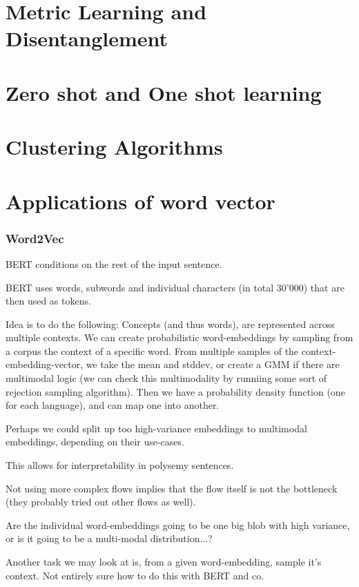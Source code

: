 \documentclass[a4paper,12pt,twoside,openright]{report}
\begin{document}
\section{Metric Learning and Disentanglement}

\section{Zero shot and One shot learning }

\section{Clustering Algorithms}

\section{Applications of word vector}

\newpage
\subsubsection{Word2Vec}

BERT conditions on the rest of the input sentence.

BERT uses words, subwords and individual characters (in total 30'000) that are then used as tokens.

Idea is to do the following:
Concepts (and thus words), are represented across multiple contexts.
We can create probabilistic word-embeddings by sampling from a corpus the context of a specific word.
From multiple samples of the context-embedding-vector, we take the mean and stddev, or create a GMM if there are multimodal logic (we can check this multimodality by runniing some sort of rejection sampling algorithm).
Then we have a probability density function (one for each language), and can map one into another.

Perhaps we could split up too high-variance embeddings to multimodal embeddings, depending on their use-cases.

This allows for interpretability in polysemy sentences.

Not using more complex flows implies that the flow itself is not the bottleneck (they probably tried out other flows as well).

Are the individual word-embeddings going to be one big blob with high variance, or is it going to be a multi-modal distribution...?

Another task we may look at is, from a given word-embedding, sample it's context. 
Not entirely sure how to do this with BERT and co.
\end{document}
